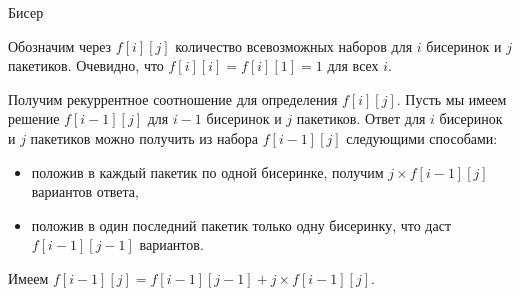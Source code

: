 \begin{tutorial}{Бисер}

Обозначим через $f[i][j]$ количество всевозможных наборов для $i$ бисеринок и $j$ пакетиков. Очевидно, что $f[i][i] = f[i][1] = 1$ для всех $i$. 

Получим рекуррентное соотношение для определения $f[i][j]$. Пусть мы имеем решение $f[i-1][j]$ для $i-1$ бисеринок и $j$ пакетиков. Ответ для $i$ бисеринок и $j$ пакетиков можно получить из набора $f[i-1][j]$ следующими способами: 
\begin{itemize}
\item положив в каждый пакетик по одной бисеринке, получим  $j \times f[i-1][j]$ вариантов ответа,
\item положив в один последний пакетик только одну бисеринку, что даст $f[i-1][j-1]$ вариантов. 
\end{itemize}
Имеем $f[i-1][j]= f[i-1][j-1]+ j \times f[i-1][j]$.


\end{tutorial}
